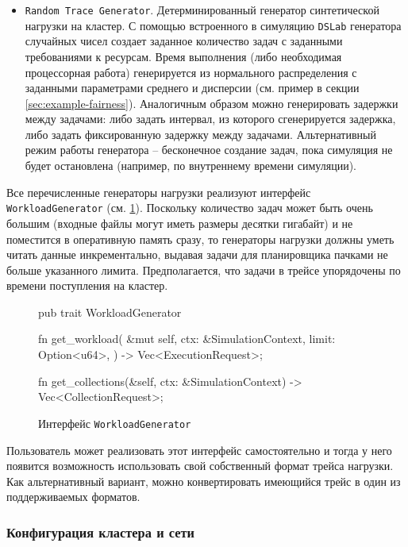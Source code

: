 \begin{itemize}
   \item \texttt{Random Trace Generator}. Детерминированный генератор синтетической нагрузки на кластер. С помощью встроенного в симуляцию \texttt{DSLab} генератора случайных чисел создает заданное количество задач с заданными требованиями к ресурсам. Время выполнения (либо необходимая процессорная работа) генерируется из нормального распределения с заданными параметрами среднего и дисперсии (см. пример в секции \ref{sec:example-fairness}). Аналогичным образом можно генерировать задержки между задачами: либо задать интервал, из которого сгенерируется задержка, либо задать фиксированную задержку между задачами. Альтернативный режим работы генератора -- бесконечное создание задач, пока симуляция не будет остановлена (например, по внутреннему времени симуляции). 

\end{itemize}

Все перечисленные генераторы нагрузки реализуют интерфейс \texttt{WorkloadGenerator} (см. \ref{fig:workload-generator-trait}). Поскольку количество задач может быть очень большим (входные файлы могут иметь размеры десятки гигабайт) и не поместится в оперативную память сразу, то генераторы нагрузки должны уметь читать данные инкрементально, выдавая задачи для планировщика пачками не больше указанного лимита. Предполагается, что задачи в трейсе упорядочены по времени поступления на кластер. 
\begin{figure}[h!]
    \footnotesize
\begin{rustcode}
pub trait WorkloadGenerator {
  fn get_workload(
    &mut self, ctx: &SimulationContext, limit: Option<u64>,
  ) -> Vec<ExecutionRequest>;
  
  fn get_collections(&self, ctx: &SimulationContext) -> Vec<CollectionRequest>;
}
\end{rustcode}
    \caption{Интерфейс \texttt{WorkloadGenerator}}
    \label{fig:workload-generator-trait}
\end{figure}

Пользователь может реализовать этот интерфейс самостоятельно и тогда у него появится возможность использовать свой собственный формат трейса нагрузки. Как альтернативный вариант, можно конвертировать имеющийся трейс в один из поддерживаемых форматов.

\subsubsection{Конфигурация кластера и сети}

